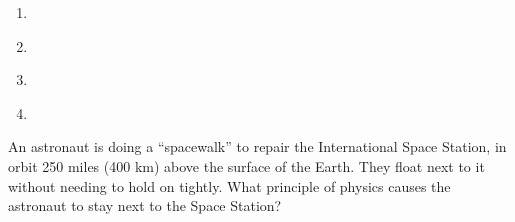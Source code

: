 \documentclass[12pt]{article}
\begin{document}
\begin{enumerate}
\begin{minipage}{\textwidth}
{\begin{enumerate}[label=(\Alph*)]
\setlength\itemsep{0.0em}
\item{  \hspace{0.05\textwidth}  }
\item{  \hspace{0.05\textwidth}  }
\item{  \hspace{0.05\textwidth}  }
\item{  \hspace{0.05\textwidth}  }
\end{enumerate}
} %
\end{minipage}


\vspace{0.5in}

\begin{minipage}{\textwidth}
\item{An astronaut is doing a ``spacewalk'' to repair the International Space Station, in orbit 250 miles (400 km) above the surface of the
Earth. They float next to it without needing to hold on 
tightly. What principle of physics causes the astronaut to stay
next to the Space Station?

}
\end{minipage}
\end{enumerate}
\end{document}

